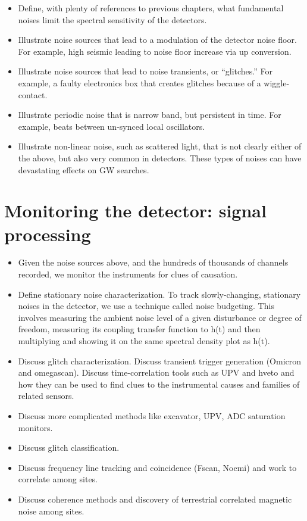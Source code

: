 \begin{itemize}
\item Define, with plenty of references to previous chapters, what fundamental noises limit the spectral sensitivity of the detectors. 
\item Illustrate noise sources that lead to a modulation of the detector noise floor. For example, high seismic leading to noise floor increase via up conversion. 
\item Illustrate noise sources that lead to noise transients, or “glitches.” For example, a faulty electronics box that creates glitches because of a wiggle-contact. 
\item Illustrate periodic noise that is narrow band, but persistent in time. For example, beats between un-synced local oscillators. 
\item Illustrate non-linear noise, such as scattered light, that is not clearly either of the above, but also very common in detectors. 
These types of noises can have devastating effects on GW searches. 
\end{itemize}


\section{Monitoring the detector: signal processing}\label{ch15:monitoring}

\begin{itemize}
\item Given the noise sources above, and the hundreds of thousands of channels recorded, we monitor the instruments for clues of causation.
\item Define stationary noise characterization. To track slowly-changing, stationary noises in the detector, we use a technique called noise budgeting. This involves measuring the ambient noise level of a given disturbance or degree of freedom, measuring its coupling transfer function to h(t) and then multiplying and showing it on the same spectral density plot as h(t).
\item Discuss glitch characterization. Discuss transient trigger generation (Omicron and omegascan). Discuss time-correlation tools such as UPV and hveto and how they can be used to find clues to the instrumental causes and families of related sensors. 
\item Discuss more complicated methods like excavator, UPV, ADC saturation monitors. 
\item Discuss glitch classification. 
\item Discuss frequency line tracking and coincidence (Fscan, Noemi) and work to correlate among sites. 
\item Discuss coherence methods and discovery of terrestrial correlated magnetic noise among sites. 
\end{itemize}

